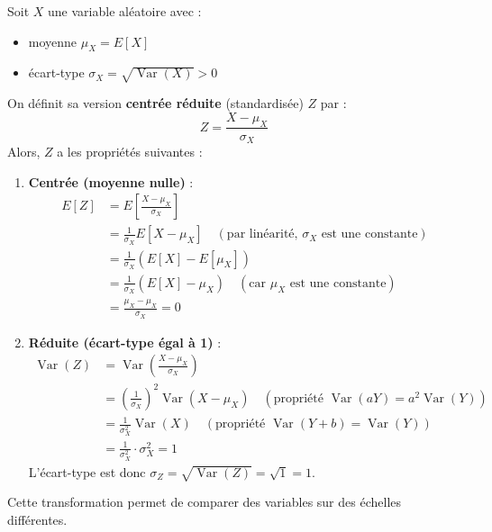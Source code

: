 \begin{definitionbox}
Soit $X$ une variable aléatoire avec :
\begin{itemize}
    \item moyenne $\mu_X = E[X]$
    \item écart-type $\sigma_X = \sqrt{\operatorname{Var}(X)} > 0$
\end{itemize}
On définit sa version \textbf{centrée réduite} (standardisée) $Z$ par :
$$Z = \frac{X - \mu_X}{\sigma_X}$$
Alors, $Z$ a les propriétés suivantes :
\begin{enumerate}
    \item \textbf{Centrée (moyenne nulle)} :
    \begin{align*}
    E[Z] &= E\left[\frac{X - \mu_X}{\sigma_X}\right] \\
         &= \frac{1}{\sigma_X} E[X - \mu_X] \quad (\text{par linéarité, } \sigma_X \text{ est une constante}) \\
         &= \frac{1}{\sigma_X} (E[X] - E[\mu_X]) \\
         &= \frac{1}{\sigma_X} (E[X] - \mu_X) \quad (\text{car } \mu_X \text{ est une constante}) \\
         &= \frac{\mu_X - \mu_X}{\sigma_X} = 0
    \end{align*}
    \item \textbf{Réduite (écart-type égal à 1)} :
    \begin{align*}
    \operatorname{Var}(Z) &= \operatorname{Var}\left(\frac{X - \mu_X}{\sigma_X}\right) \\
         &= \left(\frac{1}{\sigma_X}\right)^2 \operatorname{Var}(X - \mu_X) \quad (\text{propriété } \operatorname{Var}(aY) = a^2 \operatorname{Var}(Y)) \\
         &= \frac{1}{\sigma_X^2} \operatorname{Var}(X) \quad (\text{propriété } \operatorname{Var}(Y+b) = \operatorname{Var}(Y)) \\
         &= \frac{1}{\sigma_X^2} \cdot \sigma_X^2 = 1
    \end{align*}
    L'écart-type est donc $\sigma_Z = \sqrt{\operatorname{Var}(Z)} = \sqrt{1} = 1$.
\end{enumerate}
\end{definitionbox}

Cette transformation permet de comparer des variables sur des échelles différentes.

